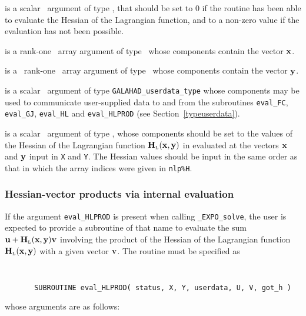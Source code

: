 \documentclass{galahad}
\newcommand{\packagename}{EXPO}
\newcommand{\fullpackagename}{\libraryname\_\packagename}
\newcommand{\solver}{{\tt \fullpackagename\_solve}}
\newcommand{\bmHL}{\bmH\sub{L}}
\begin{document}
\begin{description}
 is a scalar \intentout\ argument of type \integer,
that should be set to 0 if the routine has been able to evaluate
the Hessian of the Lagrangian function,
and to a non-zero value if the evaluation has not been possible.

 is a rank-one \intentin\ array argument of type \realdp\
whose components contain the vector ${\mathbf{x}}$.

 is a \ rank-one \intentin\ array argument of type
\realdp\ whose components contain the vector ${\mathbf{y}}$.

 is a scalar \intentinout\ argument of type
{\tt GALAHAD\_userdata\_type} whose components may be used
to communicate user-supplied data to and from the
subroutines {\tt eval\_FC}, {\tt eval\_GJ},
{\tt eval\_HL} and {\tt eval\_HLPROD}
(see Section~\ref{typeuserdata}).

 is a scalar \intentout\ argument of type \realdp,
whose components should be set to the values of the Hessian
of the Lagrangian function $\bmHL(\bmx,\bmy)$ in 
evaluated at the vectors ${\mathbf{x}}$ and ${\mathbf{y}}$  input in {\tt X} and {\tt Y}. 
The Hessian values should be input in the same order as that in which 
the array indices were given in {\tt nlp\%H}.

\end{description}


\subsubsection{Hessian-vector products via internal evaluation\label{hvfv}}

If the argument {\tt eval\_HLPROD} is present when calling \solver, the
user is expected to provide a subroutine of that name to evaluate the
sum $\bmu + \bmHL(\bmx,\bmy) \bmv$ involving the
product of the Hessian of the Lagrangian function $\bmHL(\bmx,\bmy)$
with a given vector ${\mathbf{v}}$. The routine must be specified as

\def\baselinestretch{0.8}
{\tt
\begin{verbatim}
       SUBROUTINE eval_HLPROD( status, X, Y, userdata, U, V, got_h )
\end{verbatim} }
\def\baselinestretch{1.0}
\noindent whose arguments are as follows:
\end{document}
